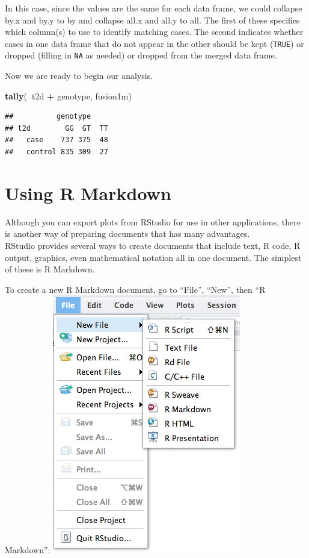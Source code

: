 \documentclass[]{book}
\newenvironment{Shaded}{\begin{snugshade}}{\end{snugshade}}
\newcommand{\KeywordTok}[1]{\textcolor[rgb]{0.13,0.29,0.53}{\textbf{#1}}}
\newcommand{\NormalTok}[1]{#1}
\newcommand{\OperatorTok}[1]{\textcolor[rgb]{0.81,0.36,0.00}{\textbf{#1}}}
\newcommand{\StringTok}[1]{\textcolor[rgb]{0.31,0.60,0.02}{#1}}
\begin{document}
In this case, since the values are the same for each data frame, we could collapse {by.x} and {by.y} to {by} and collapse {all.x} and {all.y} to {all}. The first of these specifies which column(s) to use to identify matching cases. The second indicates whether cases in one data frame that do not appear in the other should be kept (\texttt{TRUE}) or dropped (filling in \texttt{NA} as needed) or dropped from the merged data frame.

Now we are ready to begin our analysis.

\begin{Shaded}
\begin{Highlighting}[]
\KeywordTok{tally}\NormalTok{(}\OperatorTok{~}\NormalTok{t2d }\OperatorTok{+}\StringTok{ }\NormalTok{genotype, fusion1m)}
\end{Highlighting}
\end{Shaded}

\begin{verbatim}
##          genotype
## t2d        GG  GT  TT
##   case    737 375  48
##   control 835 309  27
\end{verbatim}

\hypertarget{using-r-markdown}{%
\section{Using R Markdown}\label{using-r-markdown}}

Although you can export plots from RStudio for use in other applications, there is another way of preparing documents that has many advantages.\\
RStudio provides several ways to create documents that include text, R code, R output, graphics, even mathematical notation all in one document. The simplest of these is R Markdown.

To create a new R Markdown document, go to ``File'', ``New'', then ``R Markdown'':
\includegraphics{images/NewRMarkdown.png}
\end{document}
